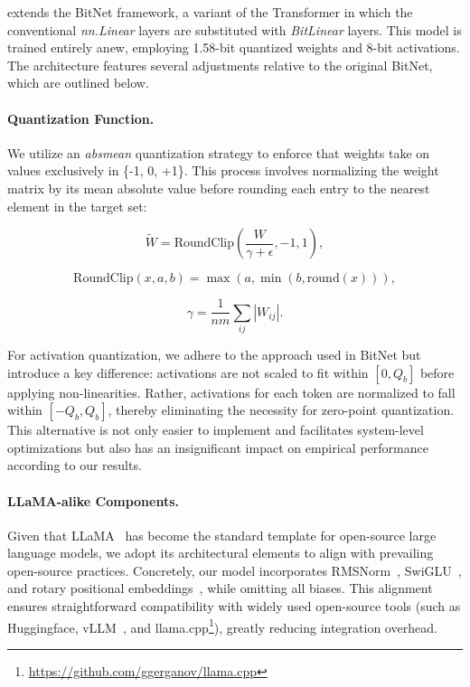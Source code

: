  extends the BitNet framework, a variant of the Transformer in which the conventional \emph{nn.Linear} layers are substituted with \emph{BitLinear} layers. This model is trained entirely anew, employing 1.58-bit quantized weights and 8-bit activations. The architecture features several adjustments relative to the original BitNet, which are outlined below.

\paragraph{Quantization Function.} We utilize an \emph{absmean} quantization strategy to enforce that weights take on values exclusively in \{-1, 0, +1\}. This process involves normalizing the weight matrix by its mean absolute value before rounding each entry to the nearest element in the target set:

\begin{equation}
    \widetilde{W} = \mathrm{RoundClip}(\frac{W}{\gamma + \epsilon}, -1, 1),
\end{equation}

\begin{equation}
    \mathrm{RoundClip}(x, a, b) = \max(a, \min(b, \mathrm{round}(x))),
\end{equation}

\begin{equation}
    \gamma = \frac{1}{nm}\sum_{ij} |W_{ij}|.
\end{equation}

For activation quantization, we adhere to the approach used in BitNet but introduce a key difference: activations are not scaled to fit within $[0, Q_b]$ before applying non-linearities. Rather, activations for each token are normalized to fall within $[-Q_b, Q_b]$, thereby eliminating the necessity for zero-point quantization. This alternative is not only easier to implement and facilitates system-level optimizations but also has an insignificant impact on empirical performance according to our results.

\paragraph{LLaMA-alike Components.}

Given that LLaMA~\cite{llama, llama2} has become the standard template for open-source large language models, we adopt its architectural elements to align  with prevailing open-source practices. Concretely, our model incorporates RMSNorm~\cite{rmsnorm}, SwiGLU~\cite{swiglu}, and rotary positional embeddings~\cite{rope}, while omitting all biases. This alignment ensures straightforward compatibility with widely used open-source tools (such as Huggingface, vLLM~\cite{vllm}, and llama.cpp\footnote{\url{https://github.com/ggerganov/llama.cpp}}), greatly reducing integration overhead.

